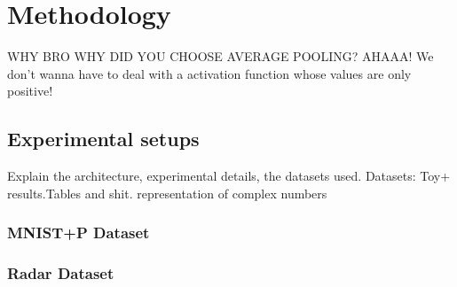 \chapter{Methodology} \label{chap:methodology}
 
 WHY BRO WHY DID YOU CHOOSE AVERAGE POOLING?
 AHAAA!  We don't wanna have to deal with a activation function whose values are only positive!
 
 
 \section{Experimental setups}
 Explain the architecture, experimental details, the datasets used. Datasets: Toy+ results.Tables and shit.
 representation of complex numbers
 
 \textbf{}
 \subsection{MNIST+P Dataset}
 
 \subsection{Radar Dataset}
 
 
 
 
 
 